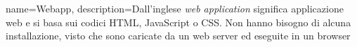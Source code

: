 {
	name={Webapp},
	description={Dall'inglese \textit{web application} significa applicazione web e si basa sui codici HTML, JavaScript o CSS. Non hanno bisogno di alcuna installazione, visto che sono caricate da un web server ed eseguite in un browser}
}